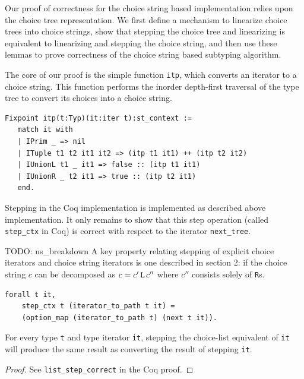 \documentclass[a4paper,english]{lipics-v2019}
\renewcommand{\L}{{\tt L}\xspace}
\newcommand{\Rs}{{\tt R}s\xspace}
\begin{document}
Our proof of correctness for the choice string based implementation relies 
upon the choice tree representation. We first define a mechanism to linearize
choice trees into choice strings, show that stepping the choice tree and linearizing
is equivalent to linearizing and stepping the choice string, and then use these lemmas
to prove correctness of the choice string based subtyping algorithm.

The core of our proof is the simple function \verb|itp|, which converts an iterator
to a choice string. This function performs the inorder depth-first traversal of the
type tree to convert its choices into a choice string. 

\begin{small}\begin{verbatim}
Fixpoint itp(t:Typ)(it:iter t):st_context :=
   match it with
   | IPrim _ => nil
   | ITuple t1 t2 it1 it2 => (itp t1 it1) ++ (itp t2 it2)
   | IUnionL t1 _ it1 => false :: (itp t1 it1)
   | IUnionR _ t2 it1 => true :: (itp t2 it1)
   end.
\end{verbatim}\end{small}

Stepping in the Coq implementation is implemented as described above
implementation. It only remains to show that this step operation (called
\verb|step_ctx| in Coq) is correct with respect to the iterator
\verb|next_tree|.

TODO: ns\_breakdown
A key property relating stepping of explicit choice iterators and choice
string iterators is one described in section 2: if the choice string $c$ 
can be decomposed as $c=c'\,\L\,c''$ where $c''$ consists solely of \Rs.

\begin{lemma}
\begin{small}\begin{verbatim}
forall t it,
    step_ctx t (iterator_to_path t it) =
    (option_map (iterator_to_path t) (next t it)).
\end{verbatim}\end{small}
For every type \verb|t| and type iterator \verb|it|,
stepping the choice-list equivalent of \verb|it| will
produce the same result as converting the result of stepping
\verb|it|.
\end{lemma}
\begin{proof}

See \verb|list_step_correct| in the Coq proof.
\end{proof}
\end{document}
